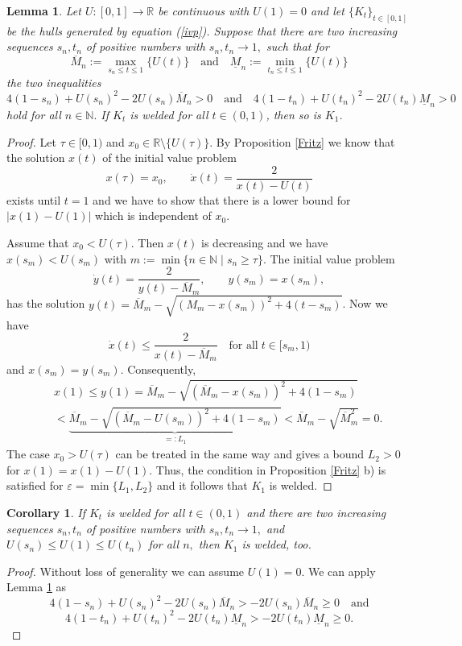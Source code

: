 \documentclass[11pt]{amsart}
\numberwithin{equation}{section}
\theoremstyle{plain}
\newtheorem{lemma}[theorem]{Lemma}
\newtheorem{corollary}[theorem]{Corollary}
\theoremstyle{definition}
\begin{document}
 
\begin{lemma}\label{stran}
Let $U:[0,1]\to{\mathbb R}$ be continuous with $U(1)=0$ and let $\{K_t\}_{t\in[0,1]}$ be the hulls generated by equation (\ref{ivp}). Suppose that there are two increasing sequences $s_n,t_n$ of positive numbers with $s_n,t_n\to1, 
$ such that for $$\overline{M}_n:=\max_{s_n\leq t\leq1}\{U(t)\}\quad \text{and} \quad \underline{M}_n:=\min_{t_n\leq t\leq1}\{U(t)\}$$ the two inequalities 
$$4(1-s_n)+U(s_n)^2-2U(s_n)\overline{M}_n>0 \quad \text{and} \quad 4(1-t_n)+U(t_n)^2-2U(t_n)\underline{M}_n>0$$
 hold for all $n\in{\mathbb N}.$ If $K_t$ is welded for all $t\in(0,1)$, then so is $K_1$.
\end{lemma}
\begin{proof}
Let $\tau\in[0,1)$ and $x_0\in{\mathbb R}\setminus\{U(\tau)\}.$
By Proposition \ref{Fritz} we know that the solution $x(t)$ of the initial value problem
 $$ x(\tau)=x_0, \qquad \dot{x}(t)=\frac{2}{x(t)-U(t)}$$
 exists until $t=1$ and we have to show that there is a lower bound for $|x(1)-U(1)|$ which is independent of $x_0$.

 Assume that $x_0<U(\tau)$. Then $x(t)$ is decreasing and we have $x(s_m)<U(s_m)$ with $m:=\min\{n\in{\mathbb N} \; |\; s_n\geq \tau\}.$ The initial value problem 
$$ \dot{y}(t)=\frac{2}{y(t)-\overline{M}_m}, \qquad  y(s_m)=x(s_m),$$
has the solution $y(t)=\overline{M}_m-\sqrt{(M_m-x(s_m))^2+4(t-s_m)}$. Now we have
 $$\dot{x}(t)\leq\frac{2}{x(t)-\overline{M}_m} \quad \text {for all} \; t\in [s_m,1)$$ and $x(s_m)=y(s_m)$. Consequently,
 \begin{eqnarray*}
  &&x(1)\leq y(1)=\overline{M}_m-\sqrt{(\overline{M}_m-x(s_m))^2+4(1-s_m)}\\
&&<\underbrace{\overline{M}_m-\sqrt{(\overline{M}_m-U(s_m))^2+4(1-s_m)}}_{=:L_1}<\overline{M}_m-\sqrt{\overline{M}_m^2}=0.
 \end{eqnarray*}
The case $x_0>U(\tau)$ can be treated in the same way and gives a bound $L_2>0$ for $x(1)=x(1)-U(1).$
Thus, the condition in Proposition \ref{Fritz} b) is satisfied for ${\varepsilon}=\min\{L_1,L_2\}$ and it follows that $K_1$ is welded.
\end{proof}
\begin{corollary}\label{cori}
 If $K_t$ is welded for all $t\in(0,1)$ and there are two increasing sequences $s_n,t_n$ of positive numbers with $s_n, t_n\to1,$ and $U(s_n)\leq U(1) \leq U(t_n)$ for all $n,$ then $K_1$ is welded, too.
\end{corollary}
\begin{proof}
Without loss of generality we can assume $U(1)=0.$ We can apply Lemma \ref{stran} as  $$4(1-s_n)+U(s_n)^2-2U(s_n)\overline{M}_n>-2U(s_n)\overline{M}_n\geq0 \quad \text{and}$$ 
$$ 4(1-t_n)+U(t_n)^2-2U(t_n)\underline{M}_n>-2U(t_n)\underline{M}_n\geq0.$$
\end{proof}
\end{document}
